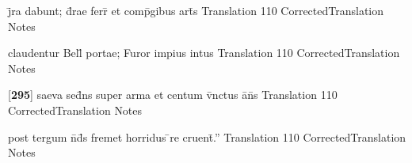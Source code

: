 \documentclass[]{book}
\begin{document}
\latline
  {j\={}ra dabunt; d\={\macron {\i}}rae ferr\={} et comp\={}gibus art\={\macron {\i}}s}
  { Translation }
  {110}
  { CorrectedTranslation }
  { Notes }


\latline
  {claudentur Bell\={\macron {\i}} portae; Furor impius intus}
  { Translation }
  {110}
  { CorrectedTranslation }
  { Notes }


\latline
  {[\textbf{295}] saeva sed\={}ns super arma et centum v\={\macron {\i}}nctus a\={}n\={\macron {\i}}s}
  { Translation }
  {110}
  { CorrectedTranslation }
  { Notes }


\latline
  {post tergum n\={}d\={\macron {\i}}s fremet horridus \={}re cruent\={}.''}
  { Translation }
  {110}
  { CorrectedTranslation }
  { Notes }
\end{document}
